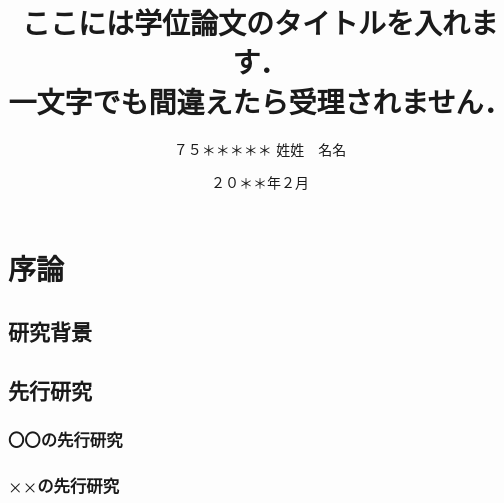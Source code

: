 \documentclass[openany,oneside,paper=a4paper,book,fontsize=12pt,jafontsize=12pt]{jlreq}
\begin{document}
\frontmatter

\title{ここには学位論文のタイトルを入れます．\\ 一文字でも間違えたら受理されません．}
\date{２０＊＊年２月}
\author{%
７５＊＊＊＊＊
\zw%
姓姓　名名
} %

\makecover

\pagestyle{empty}
\def\thepage{}
\tableofcontents

\signary

\lipsum[1-8]


\mainmatter
\newpage
\setcounter{page}{0}

\chapter{序論}
\label{ch:introduction}

\lipsum[1]

\section{研究背景}
\label{sec:background}

\lipsum[1-8]

\section{先行研究}
\label{sec:previous}

\lipsum[1-2]

\subsection{〇〇の先行研究}
\label{ssec:marumaru}

\lipsum[1-4]

\subsection{××の先行研究}
\label{ssec:batsubatsu}
\end{document}
